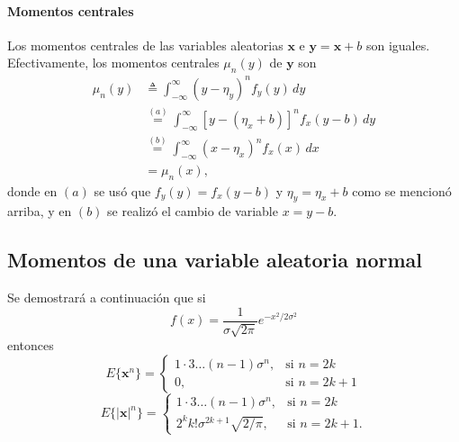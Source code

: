 \documentclass[a4paper]{report}
\newcommand{\x}{\mathbf{x}}
\newcommand{\y}{\mathbf{y}}
\begin{document}
\paragraph{Momentos centrales} Los momentos centrales de las variables aleatorias \(\x\) e \(\y=\x+b\) son iguales. Efectivamente, los momentos centrales \(\mu_n(y)\) de \(\y\) son
\begin{align*}
 \mu_n(y)&\triangleq\int_{-\infty}^{\infty}(y-\eta_y)^nf_y(y)\,dy\\ 
    &\overset{(a)}{=}\int_{-\infty}^{\infty}\left[y-(\eta_x+b)\right]^nf_x(y-b)\,dy\\
    &\overset{(b)}{=}\int_{-\infty}^{\infty}(x-\eta_x)^nf_x(x)\,dx\\
    &=\mu_n(x),
\end{align*}
donde en \((a)\) se usó que \(f_y(y)=f_x(y-b)\) y \(\eta_y=\eta_x+b\) como se mencionó arriba, y en \((b)\) se realizó el cambio de variable \(x=y-b\).

\subsection{Momentos de una variable aleatoria normal}\label{sec:normal_rv_moments}

Se demostrará a continuación que si
\[
 f(x)=\frac{1}{\sigma\sqrt{2\pi}}e^{-x^2/2\sigma^2}
\]
entonces
\begin{equation}\label{eq:gaussian_rv_moments}
 E\{\x^n\}=
 \left\{\begin{array}{ll}
  1\cdot 3\dots(n-1)\sigma^n, & \textrm{si }n=2k \\
  0, & \textrm{si }n=2k+1
 \end{array} \right.
\end{equation}
\begin{equation}\label{eq:gaussian_rv_absolute_moments}
 E\{|\x|^n\}=
 \left\{\begin{array}{ll}
  1\cdot 3\dots(n-1)\sigma^n, & \textrm{si }n=2k \\
  2^kk!\sigma^{2k+1}\sqrt{2/\pi}, & \textrm{si }n=2k+1.
 \end{array} \right.
\end{equation}
\end{document}
